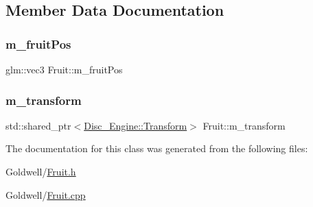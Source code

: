 \subsection{Member Data Documentation}
\mbox{\label{class_fruit_a0b8f4070211f8ed33779d22d9b3a0cb0}} 
\subsubsection{\texorpdfstring{m\+\_\+fruit\+Pos}{m\_fruitPos}}
{\footnotesize\ttfamily glm\+::vec3 Fruit\+::m\+\_\+fruit\+Pos\hspace{0.3cm}{\ttfamily [private]}}

\mbox{\label{class_fruit_af8de25a7f3f1bd9aa41ad648af892f27}} 
\subsubsection{\texorpdfstring{m\+\_\+transform}{m\_transform}}
{\footnotesize\ttfamily std\+::shared\+\_\+ptr$<$\mbox{\hyperlink{class_disc___engine_1_1_transform}{Disc\+\_\+\+Engine\+::\+Transform}}$>$ Fruit\+::m\+\_\+transform\hspace{0.3cm}{\ttfamily [private]}}



The documentation for this class was generated from the following files\+:\begin{DoxyCompactItemize}
\item 
Goldwell/\mbox{\hyperlink{_fruit_8h}{Fruit.\+h}}\item 
Goldwell/\mbox{\hyperlink{_fruit_8cpp}{Fruit.\+cpp}}\end{DoxyCompactItemize}
